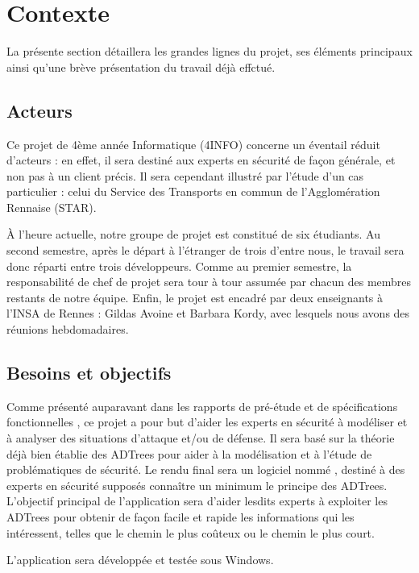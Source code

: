 \section{Contexte}
	\label{sec:contexte}

	La présente section détaillera les grandes lignes du projet, ses éléments principaux ainsi qu'une brève présentation du travail déjà effctué.

	\subsection{Acteurs}

	Ce projet de 4ème année Informatique (4INFO) concerne un éventail réduit d'acteurs : en effet, il sera destiné aux experts en sécurité de façon générale, et non pas à un client précis. Il sera cependant illustré par l'étude d'un cas particulier : celui du Service des Transports en commun de l'Agglomération Rennaise (STAR).

	À l'heure actuelle, notre groupe de projet est constitué de six étudiants. Au second semestre, après le départ à l’étranger de trois d'entre nous, le travail sera donc réparti entre trois développeurs. Comme au premier semestre, la responsabilité de chef de projet sera tour à tour assumée par chacun des membres restants de notre équipe. Enfin, le projet est encadré par deux enseignants à l'INSA de Rennes : Gildas {\sc Avoine} et Barbara {\sc Kordy}, avec lesquels nous avons des réunions hebdomadaires.

	\subsection{Besoins et objectifs}

	Comme présenté auparavant dans les rapports de pré-étude %
	et de spécifications fonctionnelles %
	, ce projet a pour but d'aider les experts en sécurité à modéliser et à analyser des situations d'attaque et/ou de défense. Il sera basé sur la théorie déjà bien établie des ADTrees pour aider à la modélisation et à l'étude de problématiques de sécurité. Le rendu final sera un logiciel nommé \glasir{}, destiné à des experts en sécurité supposés connaître un minimum le principe des ADTrees. L'objectif principal de l'application sera d'aider lesdits experts à exploiter les ADTrees pour obtenir de façon facile et rapide les informations qui les intéressent, telles que le chemin le plus coûteux ou le chemin le plus court.

	L'application sera développée et testée sous Windows.


